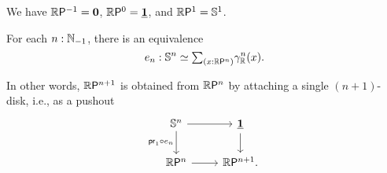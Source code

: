 \begin{eg}
We have $\mathbb{R}\mathsf{P}^{-1}=\mathbf{0}$, $\mathbb{R}\mathsf{P}^{0}=\underline{\mathbf{1}}$, and $\mathbb{R}\mathsf{P}^{1}=\mathbb{S}^{1}$. 
\end{eg}

\begin{thm}\label{thm:Sn_totalcov}
For each $n:\mathbb{N}_{-1}$, there is an equivalence
\begin{equation*}
e_n:\eqv{\sphere{n}}{\sm{x:\rprojective{n}}\tautfam[\R]{n}(x)}.
\end{equation*}
\end{thm}

In other words, $\mathbb{R}\mathsf{P}^{n+1}$ is obtained from $\mathbb{R}\mathsf{P}^{n}$ by attaching a single $(n+1)$\nobreakdash-disk, i.e., as a pushout
\begin{equation*}
\begin{tikzcd}
\sphere{n} \arrow[r] \arrow[d,swap,"\proj1\circ e_n"] & \unit \arrow[d] \\
\rprojective{n} \arrow[r] & \rprojective{n+1}.
\end{tikzcd}
\end{equation*}

